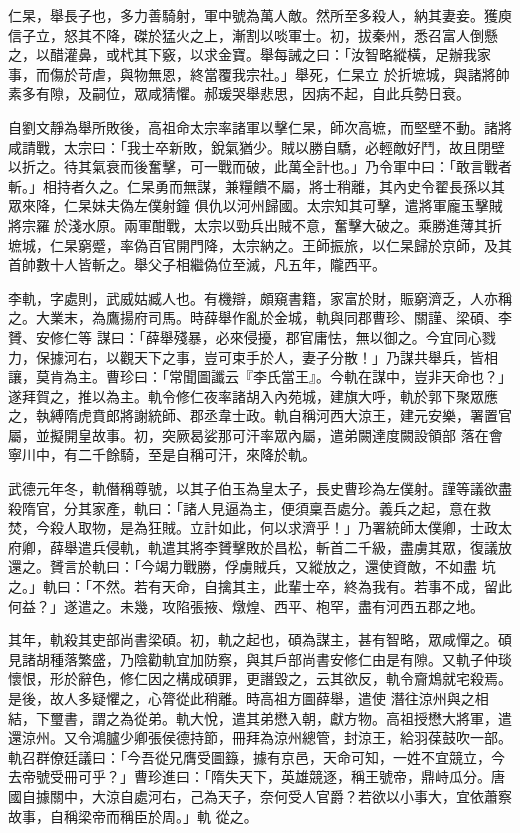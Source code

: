 \begin{pinyinscope}
 仁杲，舉長子也，多力善騎射，軍中號為萬人敵。然所至多殺人，納其妻妾。獲庾信子立，怒其不降，磔於猛火之上，漸割以啖軍士。初，拔秦州，悉召富人倒懸之，以醋灌鼻，或杙其下竅，以求金寶。舉每誡之曰：「汝智略縱橫，足辦我家事，而傷於苛虐，與物無恩，終當覆我宗社。」舉死，仁杲立
 於折墌城，與諸將帥素多有隙，及嗣位，眾咸猜懼。郝瑗哭舉悲思，因病不起，自此兵勢日衰。



 自劉文靜為舉所敗後，高祖命太宗率諸軍以擊仁杲，師次高墌，而堅壁不動。諸將咸請戰，太宗曰：「我士卒新敗，銳氣猶少。賊以勝自驕，必輕敵好鬥，故且閉壁以折之。待其氣衰而後奮擊，可一戰而破，此萬全計也。」乃令軍中曰：「敢言戰者斬。」相持者久之。仁杲勇而無謀，兼糧饋不屬，將士稍離，其內史令翟長孫以其眾來降，仁杲妹夫偽左僕射鐘
 俱仇以河州歸國。太宗知其可擊，遣將軍龐玉擊賊將宗羅於淺水原。兩軍酣戰，太宗以勁兵出賊不意，奮擊大破之。乘勝進薄其折墌城，仁杲窮蹙，率偽百官開門降，太宗納之。王師振旅，以仁杲歸於京師，及其首帥數十人皆斬之。舉父子相繼偽位至滅，凡五年，隴西平。



 李軌，字處則，武威姑臧人也。有機辯，頗窺書籍，家富於財，賑窮濟乏，人亦稱之。大業末，為鷹揚府司馬。時薛舉作亂於金城，軌與同郡曹珍、關謹、梁碩、李贇、安修仁等
 謀曰：「薛舉殘暴，必來侵擾，郡官庸怯，無以御之。今宜同心戮力，保據河右，以觀天下之事，豈可束手於人，妻子分散！」乃謀共舉兵，皆相讓，莫肯為主。曹珍曰：「常聞圖讖云『李氏當王』。今軌在謀中，豈非天命也？」遂拜賀之，推以為主。軌令修仁夜率諸胡入內苑城，建旗大呼，軌於郭下聚眾應之，執縛隋虎賁郎將謝統師、郡丞韋士政。軌自稱河西大涼王，建元安樂，署置官屬，並擬開皇故事。初，突厥曷娑那可汗率眾內屬，遣弟闕達度闕設領部
 落在會寧川中，有二千餘騎，至是自稱可汗，來降於軌。



 武德元年冬，軌僭稱尊號，以其子伯玉為皇太子，長史曹珍為左僕射。謹等議欲盡殺隋官，分其家產，軌曰：「諸人見逼為主，便須稟吾處分。義兵之起，意在救焚，今殺人取物，是為狂賊。立計如此，何以求濟乎！」乃署統師太僕卿，士政太府卿，薛舉遣兵侵軌，軌遣其將李贇擊敗於昌松，斬首二千級，盡虜其眾，復議放還之。贇言於軌曰：「今竭力戰勝，俘虜賊兵，又縱放之，還使資敵，不如盡
 坑之。」軌曰：「不然。若有天命，自擒其主，此輩士卒，終為我有。若事不成，留此何益？」遂遣之。未幾，攻陷張掖、燉煌、西平、枹罕，盡有河西五郡之地。



 其年，軌殺其吏部尚書梁碩。初，軌之起也，碩為謀主，甚有智略，眾咸憚之。碩見諸胡種落繁盛，乃陰勸軌宜加防察，與其戶部尚書安修仁由是有隙。又軌子仲琰懷恨，形於辭色，修仁因之構成碩罪，更譖毀之，云其欲反，軌令齎鴆就宅殺焉。是後，故人多疑懼之，心膂從此稍離。時高祖方圖薛舉，遣使
 潛往涼州與之相結，下璽書，謂之為從弟。軌大悅，遣其弟懋入朝，獻方物。高祖授懋大將軍，遣還涼州。又令鴻臚少卿張侯德持節，冊拜為涼州總管，封涼王，給羽葆鼓吹一部。軌召群僚廷議曰：「今吾從兄膺受圖籙，據有京邑，天命可知，一姓不宜競立，今去帝號受冊可乎？」曹珍進曰：「隋失天下，英雄競逐，稱王號帝，鼎峙瓜分。唐國自據關中，大涼自處河右，己為天子，奈何受人官爵？若欲以小事大，宜依蕭察故事，自稱梁帝而稱臣於周。」軌
 從之。




\end{pinyinscope}
